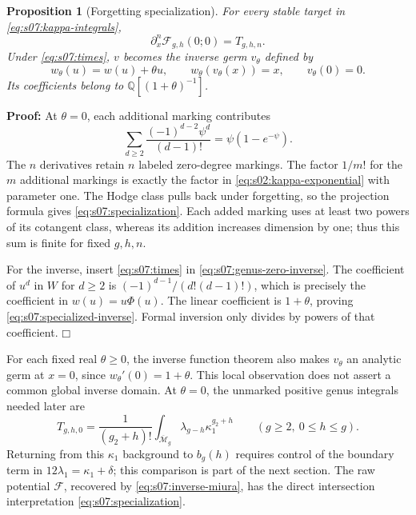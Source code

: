 \documentclass[a4paper,10pt]{article}
\numberwithin{equation}{section}
\newcommand{\MM}{\overline{\mathcal{M}}}
\theoremstyle{paperplain}
\newtheorem{prp}[thm]{Proposition}
\theoremstyle{paperremark}
\theoremstyle{paperplain}
\newenvironment{prf}{\noindent \textbf{Proof: }}{\hfill $\mdlgwhtsquare$\par\addvspace{0.5\baselineskip}}
\begin{document}
\begin{prp}[Forgetting specialization]\label{prp:s07:specialization}
For every stable target in \eqref{eq:s07:kappa-integrals},
\begin{equation}\label{eq:s07:specialization}
 \partial_x^n\mathcal F_{g,h}(0;0)=T_{g,h,n}.
\end{equation}
Under \eqref{eq:s07:times}, $v$ becomes the inverse germ $v_\theta$
defined by
\begin{equation}\label{eq:s07:specialized-inverse}
 w_\theta(u)=w(u)+\theta u,\qquad
 w_\theta(v_\theta(x))=x,\qquad v_\theta(0)=0.
\end{equation}
Its coefficients belong to $\mathbb Q[(1+\theta)^{-1}]$.
\end{prp}
\begin{prf}
At $\theta=0$, each additional marking contributes
\begin{equation}\label{eq:s07:new-marking}
 \sum_{d\geq2}\frac{(-1)^{d-2}\psi^d}{(d-1)!}
                    =\psi(1-e^{-\psi}).
\end{equation}
The $n$ derivatives retain $n$ labeled zero-degree markings. The
factor $1/m!$ for the $m$ additional markings is exactly the factor
in \eqref{eq:s02:kappa-exponential} with parameter one. The Hodge
class pulls back under forgetting, so the projection formula gives
\eqref{eq:s07:specialization}. Each added marking uses at least
two powers of its cotangent class, whereas its addition increases
dimension by one; thus this sum is finite for fixed $g,h,n$.

For the inverse, insert \eqref{eq:s07:times} in
\eqref{eq:s07:genus-zero-inverse}. The coefficient of $u^d$ in
$W$ for $d\geq2$ is $(-1)^{d-1}/(d!(d-1)!)$, which is precisely
the coefficient in $w(u)=u\Phi(u)$. The linear coefficient is
$1+\theta$, proving \eqref{eq:s07:specialized-inverse}.
Formal inversion only divides by powers of that coefficient.
\end{prf}

For each fixed real $\theta\geq0$, the inverse function theorem
also makes $v_\theta$ an analytic germ at $x=0$, since
$w_\theta'(0)=1+\theta$. This local observation does not assert a
common global inverse domain. At $\theta=0$, the unmarked positive
genus integrals needed later are
\begin{equation}\label{eq:s07:unmarked}
 T_{g,h,0}
 =\frac1{(g_2+h)!}\int_{\MM_g}\lambda_{g-h}\kappa_1^{g_2+h}
       \qquad(g\geq2,\ 0\leq h\leq g).
\end{equation}
Returning from this $\kappa_1$ background to $b_g(h)$ requires control
of the boundary term in $12\lambda_1=\kappa_1+\delta$; this comparison
is part of the next section. The raw potential $\mathcal F$,
recovered by \eqref{eq:s07:inverse-miura}, has the direct intersection
interpretation \eqref{eq:s07:specialization}.
\end{document}
